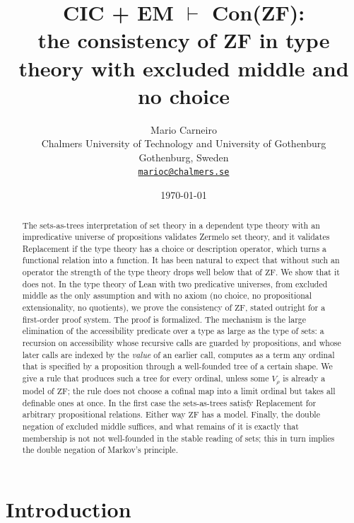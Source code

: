 \documentclass[10pt]{article}
\theoremstyle{definition}
\theoremstyle{remark}
\newcommand{\ZF}{\mathrm{ZF}}
\begin{document}
\title{\sffamily\bfseries CIC + EM $\boldsymbol{\vdash}$ Con(ZF):\\[0.3ex]
  \normalfont\sffamily\large the consistency of ZF in type theory with excluded middle and no choice}
\author{Mario Carneiro\\[0.5ex]
  \small Chalmers University of Technology and University of Gothenburg\\
  \small Gothenburg, Sweden\\
  \small\href{mailto:marioc@chalmers.se}{\texttt{marioc@chalmers.se}}}
\date{\today}
\maketitle

\begin{abstract}
The sets-as-trees interpretation of set theory in a dependent type
theory with an impredicative universe of propositions validates
Zermelo set theory, and it validates Replacement if the type theory
has a choice or description operator, which turns a functional relation
into a function. It has been natural to expect that without such an
operator the strength of the type theory drops well below that of $\ZF$. We
show that it does not. In the type theory of Lean with two predicative
universes, from excluded middle as the only assumption and with no
axiom (no choice, no propositional extensionality, no quotients), we
prove the consistency of $\ZF$, stated outright for a first-order proof
system. The proof is formalized. The mechanism is the large elimination
of the accessibility predicate over a type as large as the type of
sets: a recursion on accessibility whose recursive calls are guarded by
propositions, and whose later calls are indexed by the \emph{value} of
an earlier call, computes as a term any ordinal that is specified by a
proposition through a well-founded tree of a certain shape. We give a
rule that produces such a tree for every ordinal, unless some $V_\rho$ is
already a model of $\ZF$; the rule does not choose a cofinal map into a
limit ordinal but takes all definable ones at once. In the first case
the sets-as-trees satisfy Replacement for arbitrary propositional
relations. Either way $\ZF$ has a model. Finally, the double negation of
excluded middle suffices, and what remains of it is exactly that
membership is not not well-founded in the stable reading of sets; this
in turn implies the double negation of Markov's principle.
\end{abstract}

\section{Introduction}
\end{document}
